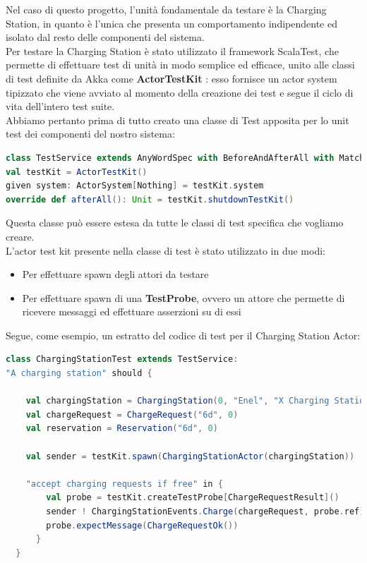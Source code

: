 Nel caso di questo progetto, l'unità fondamentale da testare è la Charging Station, in quanto è
l'unica che presenta un comportamento indipendente ed isolato dal resto delle componenti del sistema.\\

Per testare la Charging Station è stato utilizzato il framework ScalaTest, che permette di effettuare test
di unità in modo semplice ed efficace, unito alle classi di test definite da Akka come \textbf{ActorTestKit} \cite{ActorTestKit}:
esso fornisce un actor system tipizzato che viene avviato al momento della creazione dei test e segue
il ciclo di vita dell'intero test suite.\\

Abbiamo pertanto prima di tutto creato una classe di Test apposita per lo unit test dei componenti del
nostro sistema:

\begin {lstlisting}[language=scala]
class TestService extends AnyWordSpec with BeforeAndAfterAll with Matchers:
val testKit = ActorTestKit()
given system: ActorSystem[Nothing] = testKit.system
override def afterAll(): Unit = testKit.shutdownTestKit()
\end{lstlisting}

Questa classe può essere estesa da tutte le classi di test specifica che vogliamo creare.\\

L'actor test kit presente nella classe di test è stato utilizzato in due modi:

\begin{itemize}
  \item Per effettuare spawn degli attori da testare
  \item Per effettuare spawn di una \textbf{TestProbe}, ovvero un attore che permette di ricevere messaggi ed effettuare asserzioni su di essi
\end{itemize}

Segue, come esempio, un estratto del codice di test per il Charging Station Actor:

\begin {lstlisting}[language=scala]
class ChargingStationTest extends TestService:
"A charging station" should {

    val chargingStation = ChargingStation(0, "Enel", "X Charging Station", 100, Position(44.17457186518429, 12.23658150624628))
    val chargeRequest = ChargeRequest("6d", 0)
    val reservation = Reservation("6d", 0)

    val sender = testKit.spawn(ChargingStationActor(chargingStation))

    "accept charging requests if free" in {
        val probe = testKit.createTestProbe[ChargeRequestResult]()
        sender ! ChargingStationEvents.Charge(chargeRequest, probe.ref)
        probe.expectMessage(ChargeRequestOk())
      }
  }

\end{lstlisting}


